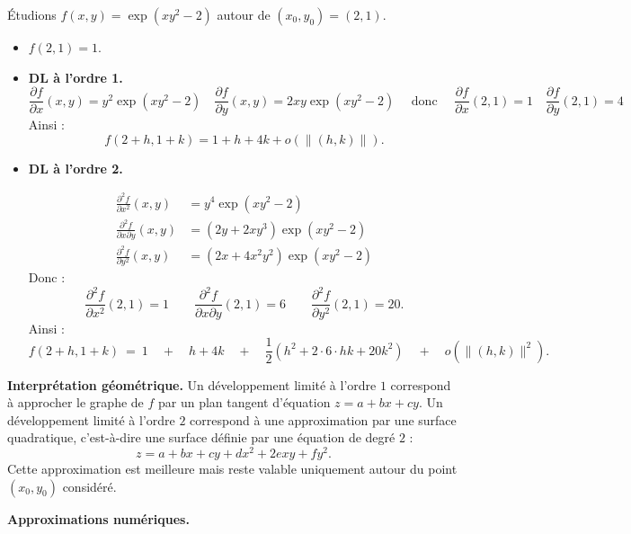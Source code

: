\begin{exemple}{}{}
Étudions $f(x,y) = \exp(xy^2-2)$ autour de $(x_0,y_0) = (2,1)$.
\begin{itemize}
    \item $f(2,1) = 1$.
    
    \item \textbf{DL à l'ordre 1.}
    $$\frac{\partial f}{\partial x}(x,y) = y^2\exp(xy^2-2)
    \quad
    \frac{\partial f}{\partial y}(x,y) = 2xy\exp(xy^2-2)
    \quad\text{ donc }\quad
    \frac{\partial f}{\partial x}(2,1) = 1
    \quad
    \frac{\partial f}{\partial y}(2,1) = 4$$
    Ainsi :
    $$f(2+h,1+k) = 1 + h + 4k + o\left(\|(h,k)\|\right).$$
  
    \item \textbf{DL à l'ordre 2.} 
    
    \begin{align*}
    \frac{\partial ^2f}{\partial x^2}(x,y) &= y^4\exp(xy^2-2) \\
    \frac{\partial ^2f}{\partial x\partial y}(x,y) &= (2y+2xy^3)\exp(xy^2-2)\\
    \frac{\partial ^2f}{\partial y^2}(x,y) &= (2x+4x^2y^2)\exp(xy^2-2)
    \end{align*}
    Donc :
    $$\frac{\partial ^2f}{\partial x^2}(2,1) = 1\qquad 
    \frac{\partial ^2f}{\partial x\partial y}(2,1) = 6 \qquad
    \frac{\partial ^2f}{\partial y^2}(2,1) = 20.$$ 
    Ainsi :
    $$   
    f(2+h,1+k)  \ 
    = \  1 \quad + \quad h + 4k
    \quad +\quad
    \frac12\left(h^2
    +2\cdot 6 \cdot hk
    +20 k^2\right)
    \quad + \quad o\left(\|(h,k)\|^2\right).$$

\end{itemize}    
       
\end{exemple}    



\bigskip

\textbf{Interprétation géométrique.}
Un développement limité à l'ordre $1$ correspond à approcher le graphe de $f$ par un plan tangent d'équation $z=a +bx+cy$. 
Un développement limité à l'ordre $2$ correspond à une approximation par une surface quadratique, c'est-à-dire une surface définie par une équation de degré $2$ :
$$z=a +bx+cy + dx^2 + 2exy + fy^2.$$
Cette approximation est meilleure mais reste valable uniquement autour du point $(x_0,y_0)$ considéré.


\bigskip

\textbf{Approximations numériques.}

